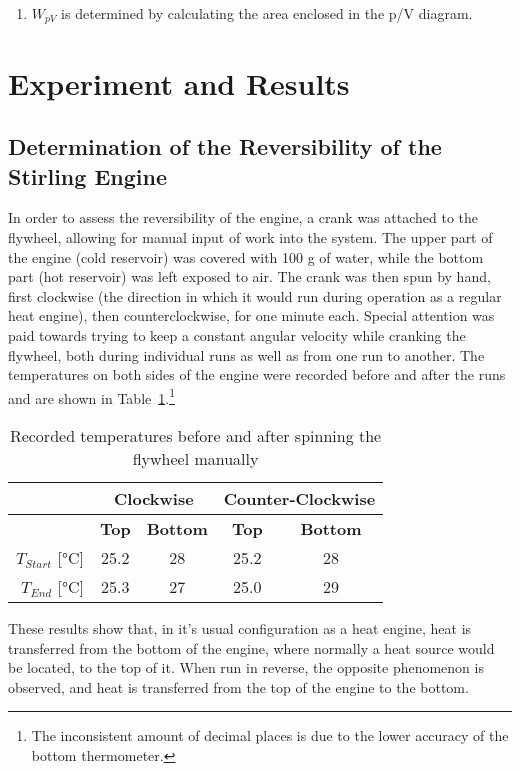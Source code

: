 \documentclass[titlepage]{article}
\begin{document}
\begin{enumerate}
    \item \(W_{pV}\) is determined by calculating the area enclosed in the p/V diagram.
\end{enumerate}


\newpage
\section{Experiment and Results}

\subsection{Determination of the Reversibility of the Stirling Engine}
In order to assess the reversibility of the engine, a crank was attached to the flywheel, allowing for manual input of work into the system. The upper part of the engine (cold reservoir) was covered with 100 g of water, while the bottom part (hot reservoir) was left exposed to air.
The crank was then spun by hand, first clockwise (the direction in which it would run during operation as a regular heat engine), then counterclockwise, for one minute each. Special attention was paid towards trying to keep a constant angular velocity while cranking the flywheel, both during individual runs as well as from one run to another.
The temperatures on both sides of the engine were recorded before and after the runs and are shown in Table~\ref{tb_manual_temps}.\footnote{The inconsistent amount of decimal places is due to the lower accuracy of the bottom thermometer.}

\begin{table}[H]
    \centering
    \caption{Recorded temperatures before and after spinning the flywheel manually}
    \label{tb_manual_temps}
    \begin{tabular}{|r|c|c|c|c|}
        \hline
        & \multicolumn{2}{|c|}{\textbf{Clockwise}} & \multicolumn{2}{|c|}{\textbf{Counter-Clockwise}}
        \\
        \hline
        & \textbf{Top} & \textbf{Bottom} & \textbf{Top} & \textbf{Bottom}
        \\
        \hline
        \(T_{Start}\) [°C] & 25.2 & 28 & 25.2 & 28
        \\
        \hline
        \(T_{End}\) [°C] & 25.3 & 27 & 25.0 & 29
        \\
        \hline
    \end{tabular}
\end{table}
%
\noindent These results show that, in it's usual configuration as a heat engine, heat is transferred from the bottom of the engine, where normally a heat source would be located, to the top of it. When run in reverse, the opposite phenomenon is observed, and heat is transferred from the top of the engine to the bottom.
\end{document}
